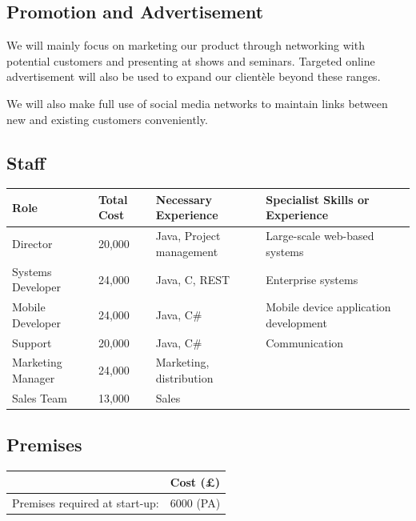 \documentclass[DIV=calc, paper=a4, fontsize=11pt]{scrartcl}	 %
\begin{document}
\subsection{Promotion and Advertisement}
We will mainly focus on marketing our product through networking with potential customers and 
presenting at shows and seminars. Targeted online advertisement will also be used to expand our
clientèle beyond these ranges.

We will also make full use of social media networks to maintain links between new and existing
customers conveniently.



\subsection{Staff}
\begin{tabular}{|l|l|l|l|}\hline
Role              & Total Cost & Necessary Experience     & Specialist Skills or Experience \\ \hline
Director          & 20,000     & Java, Project management & Large-scale web-based systems \\ \hline
Systems Developer & 24,000     & Java, C, REST            & Enterprise systems \\ \hline
Mobile Developer  & 24,000     & Java, C\#                & Mobile device application development \\ \hline
Support           & 20,000     & Java, C\#                & Communication \\ \hline
Marketing Manager & 24,000     & Marketing, distribution  & \\ \hline
Sales Team        & 13,000     & Sales                    & \\ \hline
\end{tabular}

\subsection{Premises}
\begin{tabular}{|l|l|} \hline
                               & Cost (\pounds) \\ \hline
Premises required at start-up: & 6000 (PA)      \\ \hline
\end{tabular}
\end{document}
